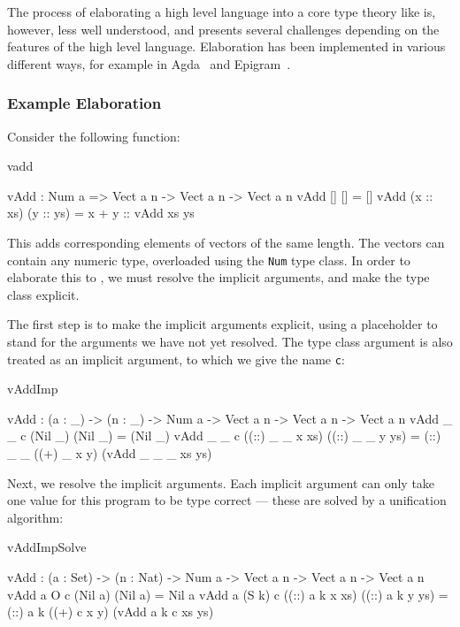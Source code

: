 The process of elaborating a high level language into a core type theory like \TT{} is,
however, less well understood, and presents several challenges depending on the
features of the high level language. Elaboration has been implemented in various different ways, 
for example in Agda~\cite{norell2007thesis} and Epigram~\cite{McBride2004a}.

\subsubsection{Example Elaboration}

Consider the following \Idris{} function:

\begin{SaveVerbatim}{vadd}

vAdd : Num a => Vect a n -> Vect a n -> Vect a n
vAdd []        []        = []
vAdd (x :: xs) (y :: ys) = x + y :: vAdd xs ys

\end{SaveVerbatim}

\noindent
This adds corresponding elements of vectors of the same length. The vectors can contain
any numeric type, overloaded using the \texttt{Num} type class. In order to elaborate
this to \TT{}, we must resolve the implicit arguments, and make the type class explicit.

The first step is to make the implicit arguments explicit, using a placeholder
to stand for the arguments we have not yet resolved. The type class argument is
also treated as an implicit argument, to which we give the name \texttt{c}:

\begin{SaveVerbatim}{vAddImp}

vAdd : (a : _) -> (n : _) -> Num a -> Vect a n -> Vect a n -> Vect a n
vAdd _ _ c (Nil _)         (Nil _)         = (Nil _)
vAdd _ _ c ((::) _ _ x xs) ((::) _ _ y ys) 
                = (::) _ _ ((+) _ x y) (vAdd _ _ _ xs ys)

\end{SaveVerbatim}

Next, we resolve the implicit arguments. Each implicit argument can only take
one value for this program to be type correct --- these are solved by a unification
algorithm:

\begin{SaveVerbatim}{vAddImpSolve}

vAdd : (a : Set) -> (n : Nat) -> Num a -> Vect a n -> Vect a n -> Vect a n
vAdd a O     c (Nil a)         (Nil a)         = Nil a
vAdd a (S k) c ((::) a k x xs) ((::) a k y ys) 
                = (::) a k ((+) c x y) (vAdd a k c xs ys)

\end{SaveVerbatim}

